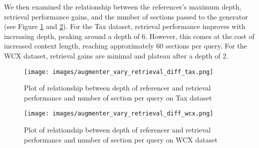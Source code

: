 
We then examined the relationship between the referencer's maximum depth, retrieval performance gains, and the number of sections passed to the generator (see Figure \ref{fig: augmenter_vary_retrieval_diff_tax} and \ref{fig: augmenter_vary_retrieval_diff_wcx}). For the Tax dataset, retrieval performance improves with increasing depth, peaking around a depth of 6. However, this comes at the cost of increased context length, reaching approximately 60 sections per query. For the WCX dataset, retrieval gains are minimal and plateau after a depth of 2.


\begin{figure}[ht]
\centering
\texttt{[image: images/augmenter\_vary\_retrieval\_diff\_tax.png]}
\caption{Plot of relationship between depth of referencer and retrieval performance and number of section per query on Tax dataset}
\label{fig: augmenter_vary_retrieval_diff_tax}
\end{figure}

\begin{figure}[ht]
\centering
\texttt{[image: images/augmenter\_vary\_retrieval\_diff\_wcx.png]}
\caption{Plot of relationship between depth of referencer and retrieval performance and number of section per query on WCX dataset}
\label{fig: augmenter_vary_retrieval_diff_wcx}
\end{figure}


